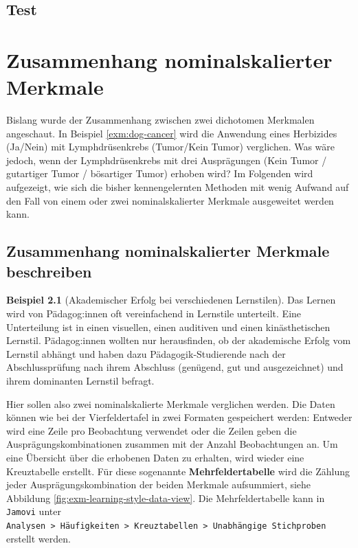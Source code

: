 \documentclass[
]{book}
\theoremstyle{definition}
\theoremstyle{definition}
\newtheorem{example}{Beispiel}[chapter]
\theoremstyle{definition}
\theoremstyle{definition}
\theoremstyle{remark}
\begin{document}
\section{Test}\label{test-6}

\chapter{Zusammenhang nominalskalierter Merkmale}\label{zusammenhang-nominalskalierter-merkmale}

Bislang wurde der Zusammenhang zwischen zwei dichotomen Merkmalen angeschaut. In Beispiel \ref{exm:dog-cancer} wird die Anwendung eines Herbizides (Ja/Nein) mit Lymphdrüsenkrebs (Tumor/Kein Tumor) verglichen. Was wäre jedoch, wenn der Lymphdrüsenkrebs mit drei Ausprägungen (Kein Tumor / gutartiger Tumor / bösartiger Tumor) erhoben wird? Im Folgenden wird aufgezeigt, wie sich die bisher kennengelernten Methoden mit wenig Aufwand auf den Fall von einem oder zwei nominalskalierter Merkmale ausgeweitet werden kann.

\section{Zusammenhang nominalskalierter Merkmale beschreiben}\label{zusammenhang-nominalskalierter-merkmale-beschreiben}

\begin{example}[Akademischer Erfolg bei verschiedenen Lernstilen]
\protect\hypertarget{exm:learning-style}{}\label{exm:learning-style}Das Lernen wird von Pädagog:innen oft vereinfachend in Lernstile unterteilt. Eine Unterteilung ist in einen visuellen, einen auditiven und einen kinästhetischen Lernstil. Pädagog:innen wollten nur herausfinden, ob der akademische Erfolg vom Lernstil abhängt und haben dazu Pädagogik-Studierende nach der Abschlussprüfung nach ihrem Abschluss (genügend, gut und ausgezeichnet) und ihrem dominanten Lernstil befragt.
\end{example}

Hier sollen also zwei nominalskalierte Merkmale verglichen werden. Die Daten können wie bei der Vierfeldertafel in zwei Formaten gespeichert werden: Entweder wird eine Zeile pro Beobachtung verwendet oder die Zeilen geben die Ausprägungskombinationen zusammen mit der Anzahl Beobachtungen an. Um eine Übersicht über die erhobenen Daten zu erhalten, wird wieder eine Kreuztabelle erstellt. Für diese sogenannte \textbf{Mehrfeldertabelle} wird die Zählung jeder Ausprägungskombination der beiden Merkmale aufsummiert, siehe Abbildung \ref{fig:exm-learning-style-data-view}. Die Mehrfeldertabelle kann in \texttt{Jamovi} unter \texttt{Analysen\ \textgreater{}\ Häufigkeiten\ \textgreater{}\ Kreuztabellen\ \textgreater{}\ Unabhängige\ Stichproben} erstellt werden.
\end{document}
